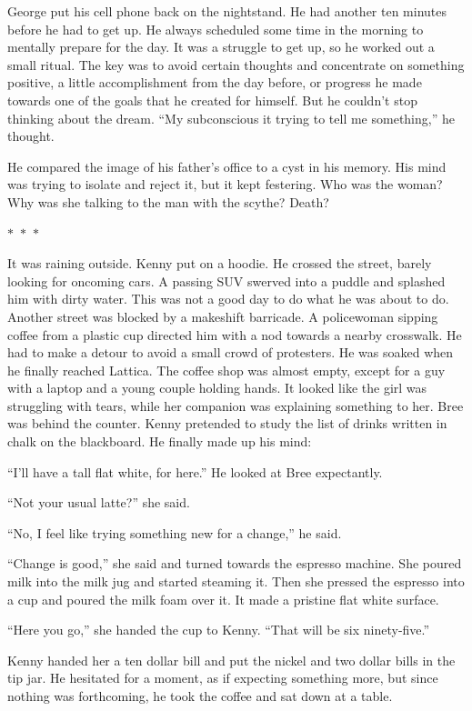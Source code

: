 \documentclass{memoir}
\newcommand{\starbreak}{%
\begin{center}
  $\ast$~$\ast$~$\ast$
\end{center}
}
\begin{document}
George put his cell phone back on the nightstand. He had another ten minutes before he had to get up. He always scheduled some time in the morning to mentally prepare for the day. It was a struggle to get up, so he worked out a small ritual. The key was to avoid certain thoughts and concentrate on something positive, a little accomplishment from the day before, or progress he made towards one of the goals that he created for himself. But he couldn't stop  thinking about the dream. ``My subconscious it trying to tell me something,'' he thought. 

He compared the image of his father's office to a cyst in his memory. His mind was trying to isolate and reject it, but it kept festering. Who was the woman? Why was she talking to the man with the scythe? Death?


\starbreak

It was raining outside. Kenny put on a hoodie. He crossed the street, barely looking for oncoming cars. A passing SUV swerved into a puddle and splashed him with dirty water. This was not a good day to do what he was about to do. Another street was blocked by a makeshift barricade. A policewoman sipping coffee from a plastic cup directed him with a nod towards a nearby crosswalk. He had to make a detour to avoid a small crowd of protesters. He was soaked when he finally reached Lattica. The coffee shop was almost empty, except for a guy with a laptop and a young couple holding hands. It looked like the girl was struggling with tears, while her companion was explaining something to her. Bree was behind the counter. Kenny pretended to study the list of drinks written in chalk on the blackboard. He finally made up his mind:

``I'll have a tall flat white, for here.'' He looked at Bree expectantly.

``Not your usual latte?'' she said.

``No, I feel like trying something new for a change,'' he said.

``Change is good,'' she said and turned towards the espresso machine. She poured milk into the milk jug and started steaming it. Then she pressed the espresso into a cup and poured the milk foam over it. It made a pristine flat white surface. 

``Here you go,'' she handed the cup to Kenny. ``That will be six ninety-five.''

Kenny handed her a ten dollar bill and put the nickel and two dollar bills in the tip jar. He hesitated for a moment, as if expecting something more, but since nothing was forthcoming, he took the coffee and sat down at a table. 
\end{document}
